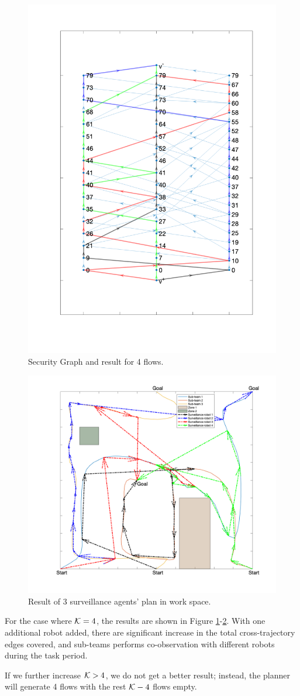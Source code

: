 \documentclass[journal]{IEEEtran}  %
\begin{document}
\begin{figure}[t]
\begin{center}
\includegraphics[width=0.4\linewidth]{graph_flow_result_4}
\caption{Security Graph and result for 4 flows.}
\label{fig:security-graph-4-flow}
\end{center}
\end{figure}

\begin{figure}[htbp]
\begin{center}
\includegraphics[width=0.6\linewidth]{4_flow_result}
\caption{Result of 3 surveillance agents' plan in work space.}
\label{fig:workspace-4-flow}
\end{center}
\end{figure}

For the case where $\mathcal{K}=4$, the results are shown in Figure \ref{fig:security-graph-4-flow}-\ref{fig:workspace-4-flow}. With one additional robot added, there are significant increase in the total cross-trajectory edges covered, and sub-teams performs co-observation with different robots during the task period.

If we further increase $\mathcal{K}>4$, we do not get a better result; instead, the planner will generate 4 flows with the rest $\mathcal{K}-4$ flows empty.
\end{document}

